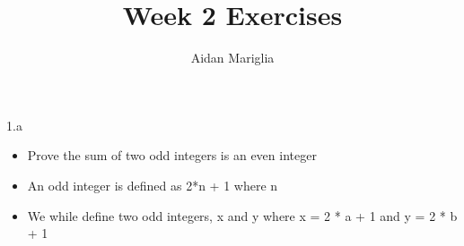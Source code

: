 \documentclass[12pt]{article}
\title{Week 2 Exercises}
\author{Aidan Mariglia}
\begin{document}
\large 1.a

\begin{itemize}

    \item Prove the sum of two odd integers is an even integer
    \item An odd integer is defined as 2*n + 1 where n \in {}
    \item We while define two odd integers, x and y where x = 2 * a + 1 and y = 2 * b + 1
    
\end{itemize}
\end{document}
